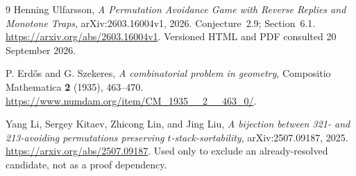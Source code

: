 \documentclass[11pt,a4paper]{article}
\theoremstyle{definition}
\theoremstyle{remark}
\begin{document}
\begin{thebibliography}{9}
Henning Ulfarsson,
\emph{A Permutation Avoidance Game with Reverse Replies and Monotone Traps},
arXiv:2603.16004v1, 2026.
Conjecture~2.9; Section~6.1.
\url{https://arxiv.org/abs/2603.16004v1}.
Versioned HTML and PDF consulted 20 September 2026.

P. Erd\H{o}s and G. Szekeres,
\emph{A combinatorial problem in geometry},
Compositio Mathematica \textbf{2} (1935), 463--470.
\url{https://www.numdam.org/item/CM_1935__2__463_0/}.

Yang Li, Sergey Kitaev, Zhicong Lin, and Jing Liu,
\emph{A bijection between 321- and 213-avoiding permutations preserving
$t$-stack-sortability}, arXiv:2507.09187, 2025.
\url{https://arxiv.org/abs/2507.09187}.
Used only to exclude an already-resolved candidate, not as a proof dependency.
\end{thebibliography}
\end{document}
